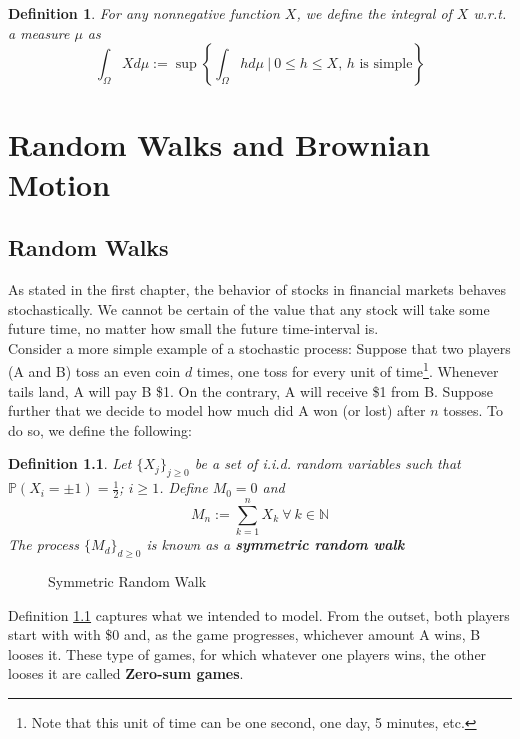 \documentclass[11pt]{report}
\newtheorem{definition}{Definition}[chapter]
\begin{document}
\begin{definition}
	For any nonnegative function $X$, we define the integral of $X$ w.r.t. a measure $\mu$ as
	\begin{equation}
		\int_\Omega Xd\mu := \sup\left\{\int_\Omega h d\mu \ | \ 0 \leq h \leq X \text{, $h$ is simple}\right\}
	\end{equation}
\end{definition}



\chapter{Random Walks and Brownian Motion}

\section{Random Walks}
As stated in the first chapter, the behavior of stocks in financial markets behaves stochastically. We cannot be certain of the value that any stock will take some future time, no matter how small the future time-interval is.\\

Consider a more simple example of a stochastic process: Suppose that two players (A and B) toss an even coin $d$ times, one toss for every unit of time\footnote{Note that this unit of time can be one second, one day, 5 minutes, etc.}. Whenever tails land, A will pay B \$1. On the contrary, A will receive \$1 from B. Suppose further that we decide to model how much did A won (or lost) after $n$ tosses. To do so, we define the following:

\begin{definition}\label{srwalk}
	Let $\{X_j\}_{j\geq0}$ be a set of i.i.d. random variables such that $\mathbb{P}(X_i = \pm 1) = \frac{1}{2}$; $i \geq 1$. Define $M_0 = 0$ and
	\[M_n := \sum_{k=1}^n X_k \ \forall \ k \in \mathbb{N}\] 
	The process $\{M_d\}_{d\geq 0}$ is known as a \textbf{symmetric random walk}
\end{definition}

\begin{figure}[h]
	\centering
	
	\caption{Symmetric Random Walk}
\end{figure}

Definition \ref{srwalk} captures what we intended to model. From the outset, both players start with with \$0 and, as the game progresses, whichever amount A wins, B looses it. These type of games, for which whatever one players wins, the other looses it are called \textbf{Zero-sum games}.\\
\end{document}
